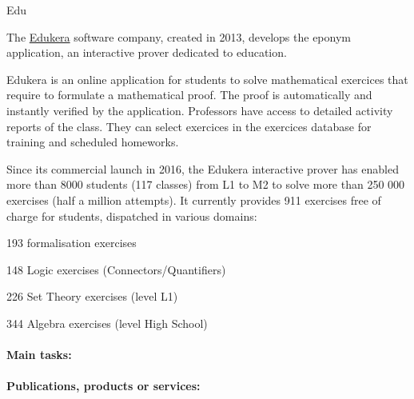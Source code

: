 \begin{sitedescription}{Edu}



The \hyperlink{https://www.edukera.com}{Edukera} software company, created in 2013,
develops the eponym application, an interactive prover dedicated to education.

Edukera is an online application for students to solve mathematical exercices that require to
formulate a mathematical proof. The proof is automatically and instantly verified by the application. Professors
have access to detailed activity reports of the class. They can select exercices in the exercices database
for training and scheduled homeworks.

Since its commercial launch in 2016, the Edukera interactive prover has enabled more than 8000 students
(117 classes) from L1 to M2 to solve more than 250 000 exercises (half a million attempts). It currently
provides 911 exercises free of charge for students, dispatched in various domains:
\begin{compactitem}
\item 193 formalisation exercises
\item 148 Logic exercises (Connectors/Quantifiers)
\item 226 Set Theory exercises (level L1)
\item 344 Algebra exercises (level High School)
\end{compactitem}

\paragraph{Main tasks:}


\begin{compactitem}
\item {}
\end{compactitem}

\paragraph{Publications, products or services:}



\end{sitedescription}
